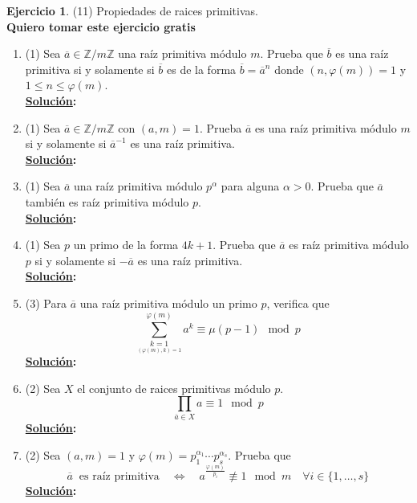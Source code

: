 \documentclass[11pt,letterpaper]{article}
\theoremstyle{definition}\newtheorem{p}{Ejercicio}
\newcommand{\Z}{\mathbb{Z}}
\newcommand{\sii}{\Longleftrightarrow}
\newcommand{\clase}[1]{\overline{#1}}  %
\newcommand{\sol}{\textbf{\underline{Solución}: }} %
\begin{document}
\begin{p}(11)
Propiedades de raices primitivas.\\
\textbf{Quiero tomar este ejercicio gratis }
\begin{enumerate}
  \item(1) Sea $\overline{a}\in\Z/m\Z$ una ra\'iz primitiva m\'odulo $m$. Prueba que $\clase{b}$ es
  una ra\'iz primitiva si y solamente si $\clase{b}$ es de la forma $\clase{b}=\clase{a}^n$ donde
  $(n,\varphi(m))=1$ y $1\leq n\leq\varphi(m)$.\\
  \sol

  \item(1) Sea $\clase{a}\in\Z/m\Z$ con $(a,m)=1$. Prueba $\clase{a}$ es una ra\'iz primitiva
  m\'odulo $m$ si y solamente si $\clase{a}^{-1}$ es una ra\'iz primitiva.\\
  \sol

  \item(1) Sea $\clase{a}$ una ra\'iz primitiva m\'odulo $p^{\alpha}$ para alguna $\alpha>0$. Prueba
  que $\clase{a}$ tambi\'en es ra\'iz primitiva m\'odulo $p$.\\
  \sol

  \item(1) Sea $p$ un primo de la forma $4k+1$. Prueba que $\clase{a}$ es ra\'iz primitiva m\'odulo $p$
  si y solamente si $-\clase{a}$ es una ra\'iz primitiva.\\
  \sol

  \item(3) Para $\clase{a}$ una ra\'iz primitiva m\'odulo un primo $p$, verifica que
  \[
    \sum_{\underset{(\varphi(m),k)=1}{k=1}}^{\varphi(m)}a^k \equiv \mu(p-1) \mod p
  \]
  \sol

  \item(2) Sea $X$ el conjunto de raices primitivas m\'odulo $p$.
  \[
    \prod_{\clase{a}\in X}a\equiv 1\mod p
  \]
  \sol

  \item(2) Sea $(a,m)=1$ y $\varphi(m)=p_1^{\alpha_1}\cdots p_s^{\alpha_s}$. Prueba que
  \[
    \clase{a}\;\;\text{es ra\'iz primitiva}\quad\sii\quad
    a^{\frac{\varphi(m)}{p_i}}\not\equiv 1\mod m\quad\forall i\in\{1,\ldots,s\}
  \]
  \sol
\end{enumerate}
\end{p} 
\pagebreak
\end{document}
